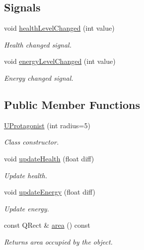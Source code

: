 \subsection*{Signals}
\begin{DoxyCompactItemize}
\item 
void \hyperlink{classUProtagonist_a51cf4f46d0b8d841ac91fb26cd175f04}{health\+Level\+Changed} (int value)
\begin{DoxyCompactList}\small\item\em Health changed signal. \end{DoxyCompactList}\item 
void \hyperlink{classUProtagonist_a5f04fffdddf19813626e2676152425d9}{energy\+Level\+Changed} (int value)
\begin{DoxyCompactList}\small\item\em Energy changed signal. \end{DoxyCompactList}\end{DoxyCompactItemize}
\subsection*{Public Member Functions}
\begin{DoxyCompactItemize}
\item 
\hyperlink{classUProtagonist_aecc46a5d2ad349f141f7d623b6454816}{U\+Protagonist} (int radius=5)
\begin{DoxyCompactList}\small\item\em Class constructor. \end{DoxyCompactList}\item 
void \hyperlink{classUProtagonist_a453bac1fc034e1c15ad8d7bdac566421}{update\+Health} (float diff)
\begin{DoxyCompactList}\small\item\em Update health. \end{DoxyCompactList}\item 
void \hyperlink{classUProtagonist_a56f48e2a59eca29575cac673a03cbd69}{update\+Energy} (float diff)
\begin{DoxyCompactList}\small\item\em Update energy. \end{DoxyCompactList}\item 
const Q\+Rect \& \hyperlink{classUProtagonist_ae564263d78b9c1e15a27392376b1c2b3}{area} () const \hypertarget{classUProtagonist_ae564263d78b9c1e15a27392376b1c2b3}{}\label{classUProtagonist_ae564263d78b9c1e15a27392376b1c2b3}

\begin{DoxyCompactList}\small\item\em Returns area occupied by the object. \end{DoxyCompactList}\end{DoxyCompactItemize}


